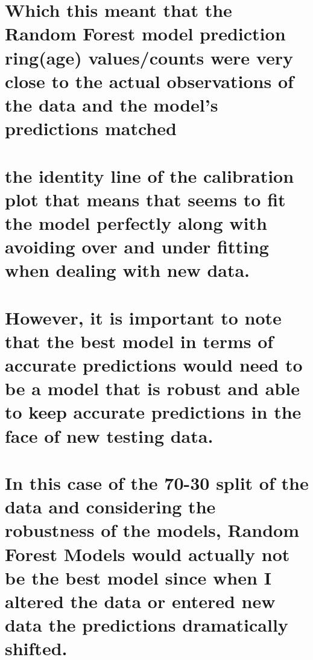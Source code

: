 \documentclass[
  letterpaper,
  DIV=11,
  numbers=noendperiod]{scrreprt}
\begin{document}
{

\chapter{Which this meant that the Random Forest model prediction
ring(age) values/counts were very close to the actual observations of
the data and the model's predictions
matched}\label{which-this-meant-that-the-random-forest-model-prediction-ringage-valuescounts-were-very-close-to-the-actual-observations-of-the-data-and-the-models-predictions-matched}


\chapter{the identity line of the calibration plot that means that seems
to fit the model perfectly along with avoiding over and under fitting
when dealing with new
data.}\label{the-identity-line-of-the-calibration-plot-that-means-that-seems-to-fit-the-model-perfectly-along-with-avoiding-over-and-under-fitting-when-dealing-with-new-data.}


\chapter{However, it is important to note that the best model in terms
of accurate predictions would need to be a model that is robust and able
to keep accurate predictions in the face of new testing
data.}\label{however-it-is-important-to-note-that-the-best-model-in-terms-of-accurate-predictions-would-need-to-be-a-model-that-is-robust-and-able-to-keep-accurate-predictions-in-the-face-of-new-testing-data.}


\chapter{In this case of the 70-30 split of the data and considering the
robustness of the models, Random Forest Models would actually not be the
best model since when I altered the data or entered new data the
predictions dramatically
shifted.}\label{in-this-case-of-the-70-30-split-of-the-data-and-considering-the-robustness-of-the-models-random-forest-models-would-actually-not-be-the-best-model-since-when-i-altered-the-data-or-entered-new-data-the-predictions-dramatically-shifted.}

}
\end{document}
